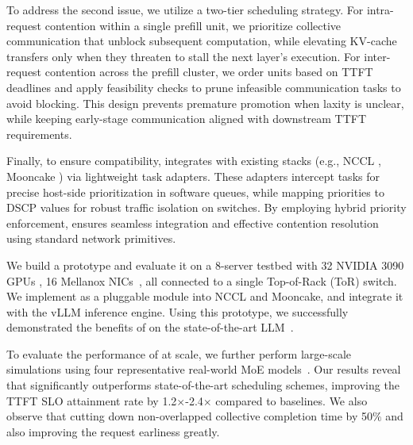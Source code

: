 To address the second issue, we utilize a two-tier scheduling strategy. For intra-request contention within a single prefill unit, we prioritize collective communication that unblock subsequent computation, while elevating KV-cache transfers only when they threaten to stall the next layer's execution. For inter-request contention across the prefill cluster, we order units based on TTFT deadlines and apply feasibility checks to prune infeasible communication tasks to avoid blocking. This design prevents premature promotion when laxity is unclear, while keeping early-stage communication aligned with downstream TTFT requirements.

Finally, to ensure compatibility, \sys{} integrates with existing stacks (e.g., NCCL \cite{nccl}, Mooncake \cite{mooncakeTE}) via lightweight task adapters. These adapters intercept tasks for precise host-side prioritization in software queues, while mapping priorities to DSCP values for robust traffic isolation on switches. By employing hybrid priority enforcement, \sys{} ensures seamless integration and effective contention resolution using standard network primitives.

We build a \sys prototype and evaluate it on a 8-server testbed with 32 NVIDIA 3090 GPUs \cite{nvidia3090}, 16 Mellanox NICs~\cite{cx5}, all connected to a single Top-of-Rack (ToR) switch. We implement \sys{} as a pluggable module into NCCL and Mooncake, and integrate it with the vLLM inference engine. Using this prototype, we successfully demonstrated the benefits of \sys{} on the state-of-the-art LLM~\cite{mixtral7b}.

To evaluate the performance of \sys{} at scale, we further perform large-scale simulations using four representative real-world MoE models~\cite{mixtral22b,grok,dbrx,qwen-coder}.
Our results reveal that \sys{} significantly outperforms state-of-the-art scheduling schemes, improving the TTFT SLO attainment rate by 1.2$\times$-2.4$\times$ compared to baselines.
We also observe that \sys{} cutting down non-overlapped collective completion time by 50$\%$ and also improving the request earliness greatly.

